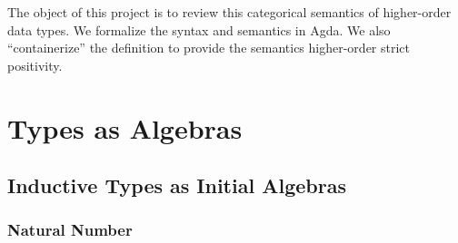 The object of this project is to review this categorical semantics of higher-order data types. We formalize the syntax and semantics in Agda. We also ``containerize'' the definition to provide the semantics higher-order strict positivity.

\section{Types as Algebras}

\subsection{Inductive Types as Initial Algebras}

\subsubsection*{Natural Number}

